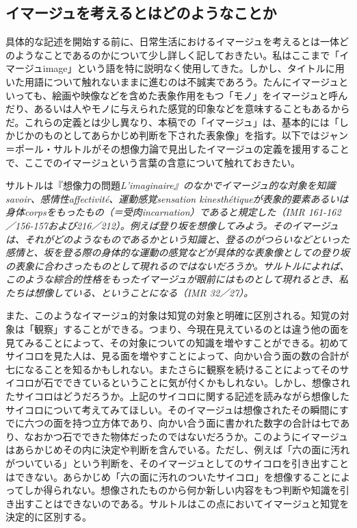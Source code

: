 \documentclass[b5j,twoside,twocolumn]{utarticle}
\begin{document}
\subsection{イマージュを考えるとはどのようなことか}
具体的な記述を開始する前に、日常生活におけるイマージュを考えるとは一体どのようなことであるのかについて少し詳しく記しておきたい。私はここまで「イマージュimage」という語を特に説明なく使用してきた。しかし、タイトルに用いた用語について触れないままに進むのは不誠実であろう。たんにイマージュといっても、絵画や映像などを含めた表象作用をもつ「モノ」をイマージュと呼んだり、あるいは人やモノに与えられた感覚的印象などを意味することもあるからだ。これらの定義とは少し異なり、本稿での「イマージュ」は、基本的には「しかじかのものとしてあらかじめ判断を下された表象像」を指す。以下ではジャン＝ポール・サルトルがその想像力論で見出したイマージュの定義を援用することで、ここでのイマージュという言葉の含意について触れておきたい。


サルトルは『想像力の問題\sl{L'imaginaire}\rm』のなかでイマージュ的な対象を知識savoir、感情性affectivité、運動感覚sensation kinesthétiqueが表象的要素あるいは身体corpsをもったもの（＝受肉incarnation）であると規定した（IMR 161-162／156-157および216／212）。例えば登り坂を想像してみよう。そのイマージュは、それがどのようなものであるかという知識と、登るのがつらいなどといった感情と、坂を登る際の身体的な運動の感覚などが具体的な表象像としての登り坂の表象に合わさったものとして現れるのではないだろうか。サルトルによれば、このような綜合的性格をもったイマージュが眼前にはものとして現れるとき、私たちは想像している、ということになる（IMR 32／27）。


また、このようなイマージュ的対象は知覚の対象と明確に区別される。知覚の対象は「観察」することができる。つまり、今現在見えているのとは違う他の面を見てみることによって、その対象についての知識を増やすことができる。初めてサイコロを見た人は、見る面を増やすことによって、向かい合う面の数の合計が七になることを知るかもしれない。またさらに観察を続けることによってそのサイコロが石でできているということに気が付くかもしれない。しかし、想像されたサイコロはどうだろうか。上記のサイコロに関する記述を読みながら想像したサイコロについて考えてみてほしい。そのイマージュは想像されたその瞬間にすでに六つの面を持つ立方体であり、向かい合う面に書かれた数字の合計は七であり、なおかつ石でできた物体だったのではないだろうか。このようにイマージュはあらかじめその内に決定や判断を含んでいる。ただし、例えば「六の面に汚れがついている」という判断を、そのイマージュとしてのサイコロを引き出すことはできない。あらかじめ「六の面に汚れのついたサイコロ」を想像することによってしか得られない。想像されたものから何か新しい内容をもつ判断や知識を引き出すことはできないのである。サルトルはこの点においてイマージュと知覚を決定的に区別する。
\end{document}
